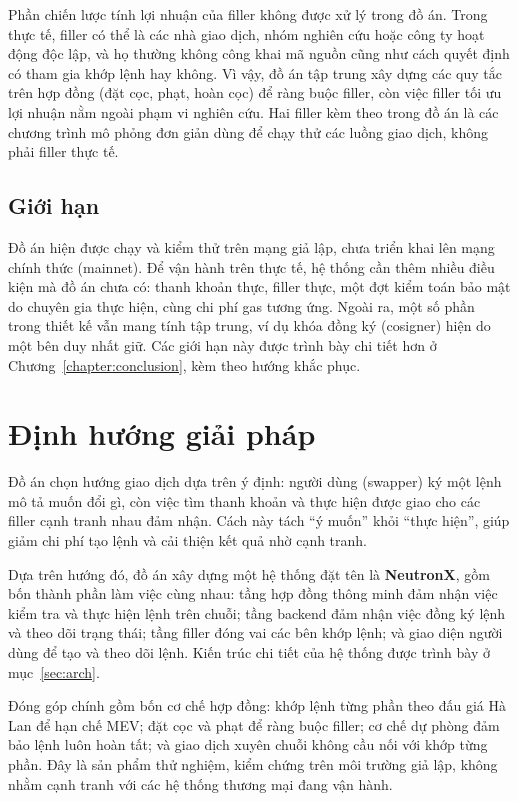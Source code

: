 \documentclass[../DoAn.tex]{subfiles}
\begin{document}
Phần chiến lược tính lợi nhuận của filler không được xử lý trong đồ án. Trong thực tế, filler có thể là các nhà giao dịch, nhóm nghiên cứu hoặc công ty hoạt động độc lập, và họ thường không công khai mã nguồn cũng như cách quyết định có tham gia khớp lệnh hay không. Vì vậy, đồ án tập trung xây dựng các quy tắc trên hợp đồng (đặt cọc, phạt, hoàn cọc) để ràng buộc filler, còn việc filler tối ưu lợi nhuận nằm ngoài phạm vi nghiên cứu. Hai filler kèm theo trong đồ án là các chương trình mô phỏng đơn giản dùng để chạy thử các luồng giao dịch, không phải filler thực tế.

\subsection{Giới hạn}
\label{subsection:1.2.3}

Đồ án hiện được chạy và kiểm thử trên mạng giả lập, chưa triển khai lên mạng chính thức (mainnet). Để vận hành trên thực tế, hệ thống cần thêm nhiều điều kiện mà đồ án chưa có: thanh khoản thực, filler thực, một đợt kiểm toán bảo mật do chuyên gia thực hiện, cùng chi phí gas tương ứng. Ngoài ra, một số phần trong thiết kế vẫn mang tính tập trung, ví dụ khóa đồng ký (cosigner) hiện do một bên duy nhất giữ. Các giới hạn này được trình bày chi tiết hơn ở Chương~\ref{chapter:conclusion}, kèm theo hướng khắc phục.

\section{Định hướng giải pháp}
\label{section:1.3}

Đồ án chọn hướng giao dịch dựa trên ý định: người dùng (swapper) ký một lệnh mô tả muốn đổi gì, còn việc tìm thanh khoản và thực hiện được giao cho các filler cạnh tranh nhau đảm nhận. Cách này tách ``ý muốn'' khỏi ``thực hiện'', giúp giảm chi phí tạo lệnh và cải thiện kết quả nhờ cạnh tranh.

Dựa trên hướng đó, đồ án xây dựng một hệ thống đặt tên là \textbf{NeutronX}, gồm bốn thành phần làm việc cùng nhau: tầng hợp đồng thông minh đảm nhận việc kiểm tra và thực hiện lệnh trên chuỗi; tầng backend đảm nhận việc đồng ký lệnh và theo dõi trạng thái; tầng filler đóng vai các bên khớp lệnh; và giao diện người dùng để tạo và theo dõi lệnh. Kiến trúc chi tiết của hệ thống được trình bày ở mục~\ref{sec:arch}.

Đóng góp chính gồm bốn cơ chế hợp đồng: khớp lệnh từng phần theo đấu giá Hà Lan để hạn chế MEV; đặt cọc và phạt để ràng buộc filler; cơ chế dự phòng đảm bảo lệnh luôn hoàn tất; và giao dịch xuyên chuỗi không cầu nối với khớp từng phần. Đây là sản phẩm thử nghiệm, kiểm chứng trên môi trường giả lập, không nhằm cạnh tranh với các hệ thống thương mại đang vận hành.
\end{document}
